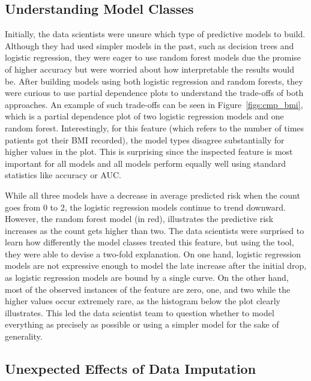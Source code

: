 \subsection{Understanding Model Classes}

Initially, the data scientists were unsure which type of predictive models to build.  Although they had used simpler models in the past, such as decision trees and logistic regression, they were eager to use random forest models due the promise of higher accuracy but were worried about how interpretable the results would be.
After building models using both logistic regression and random forests, they were curious to use partial dependence plots to understand the trade-offs of both approaches. An example of such trade-offs can be seen in Figure~\ref{figs:cmp_bmi}, which is a partial dependence plot of two logistic regression models and one random forest. Interestingly, for this feature (which refers to the number of times patients got their BMI recorded), the model types disagree substantially for higher values in the plot. This is surprising since the inspected feature is most important for all models and
all models perform equally well using standard statistics like accuracy or AUC.

While all three models have a decrease in average predicted risk when the count goes from 0 to 2, the logistic regression models continue to trend downward.  However, the random forest model (in red), illustrates the predictive risk increases as the count gets higher than two.  The data scientists were surprised to learn how differently the model classes treated this feature, but using the tool, they were able to devise a two-fold explanation.  On one hand, logistic regression models are not expressive enough to model the late increase after the initial drop, as logistic regression models are bound by a single curve.  On the other hand, most of the observed instances of the feature are zero, one, and two while the higher values occur extremely rare, as the histogram below the plot clearly illustrates.  This led the data scientist team to question whether to model everything as precisely as possible or using a simpler model for the sake of generality.

\subsection{Unexpected Effects of Data Imputation}

